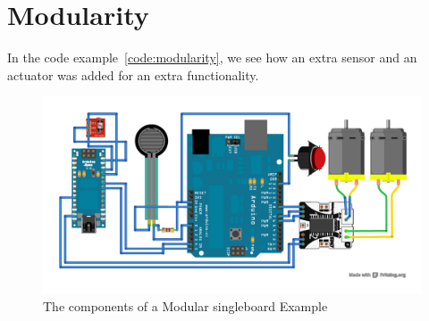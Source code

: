 	\section{Modularity} %
	\label{sec:modularity}
 In the code example~\ref{code:modularity}, we see how an extra sensor and an actuator was added for an extra functionality. 

\begin{figure}[h!]
  \begin{center}
    \includegraphics[width=1.0\columnwidth]{Figures/modular-example.pdf}
    \caption{The components of a Modular singleboard \xten Example}
  \end{center}
\end{figure}

